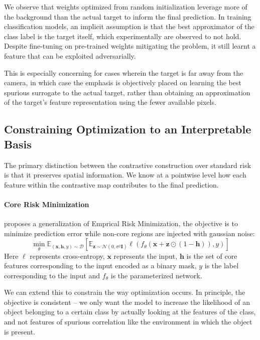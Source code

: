 \documentclass{article}
\theoremstyle{plain}
\theoremstyle{definition}
\theoremstyle{remark}
\begin{document}
We observe that weights optimized from random initialization leverage more of the background than the actual target to inform the final prediction. In training classification models, an implicit assumption is that the best approximator of the class label is the target itself, which experimentally are observed to not hold. Despite fine-tuning on pre-trained weights mitigating the problem, it still learnt a feature that can be exploited adversarially.

This is especially concerning for cases wherein the target is far away from the camera, in which case the emphasis is objectively placed on learning the best spurious surrogate to the actual target, rather than obtaining an approximation of the target's feature representation using the fewer available pixels.


\subsection{Constraining Optimization to an Interpretable Basis}
\label{sec:constraining-optimization}

The primary distinction between the contrastive construction over standard risk is that it preserves spatial information. We know at a pointwise level how each feature within the contrastive map contributes to the final prediction.

\paragraph{Core Risk Minimization \citep{singla2022core}} proposes a generalization of Emprical Risk Minimization, the objective is to minimize prediction error while non-core regions are injected with gaussian noise:
\begin{equation}
	\min_\theta \mathbb{E}_{(\bm{x}, \bm{h}, y) \sim \mathcal{D}} [ \mathbb{E}_{\bm{z} \sim \mathcal{N}(0, \sigma^2 \bm{I})} \ell(f_\theta(\bm{x} + \bm{z} \odot (1 - \bm{h})), y) ]
\end{equation}
Here $\ell$ represents cross-entropy, $\bm{x}$ represents the input, $\bm{h}$ is the set of core features corresponding to the input encoded as a binary mask, $y$ is the label corresponding to the input and $f_\theta$ is the parameterized network.

We can extend this to constrain the way optimization occurs. In principle, the objective is consistent -- we only want the model to increase the likelihood of an object belonging to a certain class by actually looking at the features of the class, and not features of spurious correlation like the environment in which the object is present.
\end{document}
